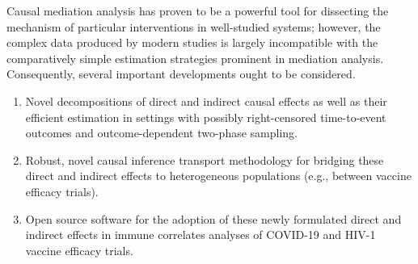 Causal mediation analysis has proven to be a powerful tool for dissecting the
mechanism of particular interventions in well-studied systems; however, the
complex data produced by modern studies is largely incompatible with the
comparatively simple estimation strategies prominent in mediation analysis.
Consequently, several important developments ought to be considered.
\begin{enumerate}[label=(\alph*)]
  \itemsep0.2pt
  \item Novel decompositions of direct and indirect causal effects as well as
      their efficient estimation in settings with possibly right-censored
      time-to-event outcomes and outcome-dependent two-phase sampling.
  \item Robust, novel causal inference transport methodology for bridging these
    direct and indirect effects to heterogeneous populations (e.g., between
    vaccine efficacy trials).
  \item Open source software for the adoption of these newly formulated direct
    and indirect effects in immune correlates analyses of COVID-19 and HIV-1
     vaccine efficacy trials.
\end{enumerate}

